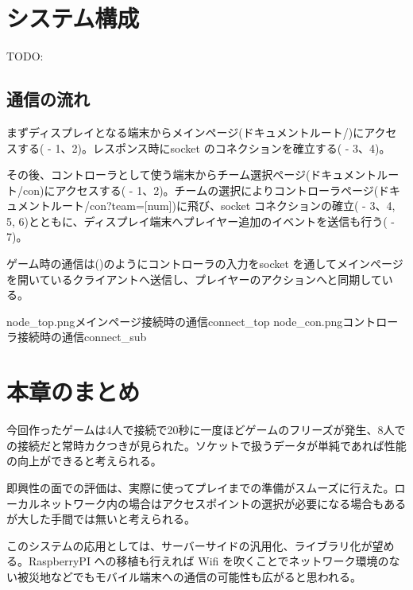 
\newpage
\section{システム構成}
TODO:
\subsection{通信の流れ}
まずディスプレイとなる端末からメインページ(ドキュメントルート/)にアクセスする( - 1、2)。レスポンス時にsocket のコネクションを確立する( - 3、4)。

その後、コントローラとして使う端末からチーム選択ページ(ドキュメントルート/con)にアクセスする( - 1、2)。チームの選択によりコントローラページ(ドキュメントルート/con?team=[num])に飛び、socket コネクションの確立( - 3、4, 5, 6)とともに、ディスプレイ端末へプレイヤー追加のイベントを送信も行う( - 7)。

ゲーム時の通信は()のようにコントローラの入力をsocket を通してメインページを開いているクライアントへ送信し、プレイヤーのアクションへと同期している。

\myfigtwo
{node_top.png}{メインページ接続時の通信}{connect_top}
{node_con.png}{コントローラ接続時の通信}{connect_sub}



\newpage

\section{本章のまとめ}
今回作ったゲームは4人で接続で20秒に一度ほどゲームのフリーズが発生、8人での接続だと常時カクつきが見られた。ソケットで扱うデータが単純であれば性能の向上ができると考えられる。

即興性の面での評価は、実際に使ってプレイまでの準備がスムーズに行えた。ローカルネットワーク内の場合はアクセスポイントの選択が必要になる場合もあるが大した手間では無いと考えられる。


このシステムの応用としては、サーバーサイドの汎用化、ライブラリ化が望める。RaspberryPI への移植も行えれば Wifi を吹くことでネットワーク環境のない被災地などでもモバイル端末への通信の可能性も広がると思われる。

\newpage
